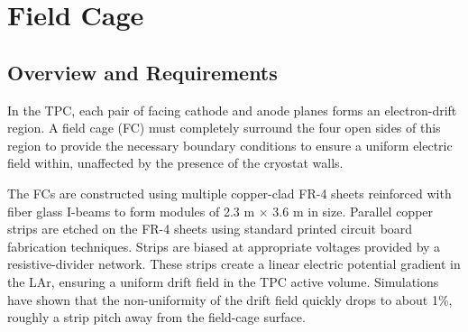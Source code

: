 



\section{Field Cage}
\label{detcompsec-fc}
\subsection{Overview and Requirements} 

In the TPC, each pair of facing cathode and anode planes forms an electron-drift region. A field
cage (FC) must completely surround the four open sides of this region to provide the necessary boundary
conditions to ensure a uniform electric field within, unaffected by the presence of the cryostat walls.

The FCs are constructed using multiple copper-clad FR-4 sheets reinforced with fiber
glass I-beams to form modules of 2.3 m $\times$ 3.6 m in size. Parallel copper strips are etched on
the FR-4 sheets using standard printed circuit board fabrication techniques. Strips are biased at
appropriate voltages provided by a resistive-divider network. These strips create a linear electric potential
gradient in the LAr, ensuring a uniform drift field in the TPC active volume. Simulations
have shown that the non-uniformity of the drift field quickly drops to about 1\%, roughly a strip
pitch away from the field-cage surface.


